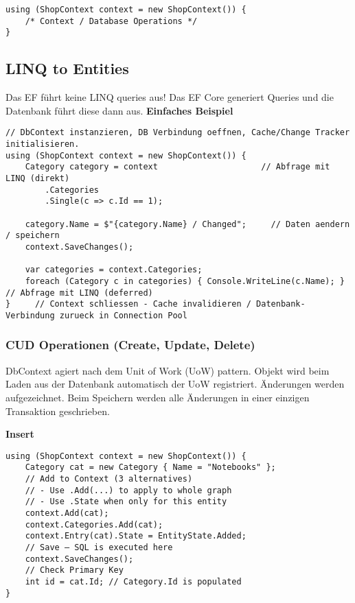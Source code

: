 \begin{lstlisting}
using (ShopContext context = new ShopContext()) {
    /* Context / Database Operations */
}
\end{lstlisting}

\subsection{LINQ to Entities}
Das EF führt keine LINQ queries aus! Das EF Core generiert Queries und die Datenbank führt diese dann aus.
\textbf{Einfaches Beispiel}
\begin{lstlisting} 
// DbContext instanzieren, DB Verbindung oeffnen, Cache/Change Tracker initialisieren.
using (ShopContext context = new ShopContext()) {          
    Category category = context                     // Abfrage mit LINQ (direkt)
        .Categories
        .Single(c => c.Id == 1);
        
    category.Name = $"{category.Name} / Changed";     // Daten aendern / speichern 
    context.SaveChanges();
    
    var categories = context.Categories;
    foreach (Category c in categories) { Console.WriteLine(c.Name); }       // Abfrage mit LINQ (deferred)
}     // Context schliessen - Cache invalidieren / Datenbank-Verbindung zurueck in Connection Pool
\end{lstlisting}

\subsubsection{CUD Operationen (Create, Update, Delete)}
DbContext agiert nach dem Unit of Work (UoW) pattern. Objekt wird beim Laden aus der
Datenbank automatisch der UoW registriert. Änderungen werden aufgezeichnet. Beim Speichern werden alle Änderungen in einer einzigen Transaktion geschrieben.

\textbf{Insert}
\begin{lstlisting}
using (ShopContext context = new ShopContext()) {
    Category cat = new Category { Name = "Notebooks" };
    // Add to Context (3 alternatives)
    // - Use .Add(...) to apply to whole graph
    // - Use .State when only for this entity
    context.Add(cat);
    context.Categories.Add(cat);
    context.Entry(cat).State = EntityState.Added;
    // Save – SQL is executed here
    context.SaveChanges();
    // Check Primary Key
    int id = cat.Id; // Category.Id is populated
}
\end{lstlisting}

